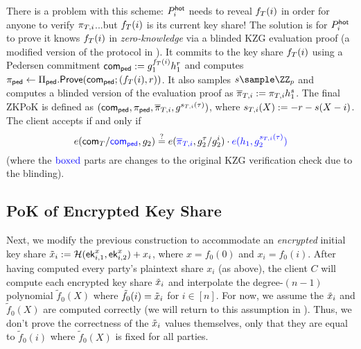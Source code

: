 There is a problem with this scheme: $P_i^{\mathsf{hot}}$ needs to reveal $f_{T}(i)$ in order for anyone to verify $\pi_{T,i}$...but $f_{T}(i)$ is its current key share! The solution is for $P_i^{\mathsf{hot}}$ to prove it knows $f_{T}(i)$ in \emph{zero-knowledge} via a blinded KZG evaluation proof (a modified version of the protocol in \cite[\S6.1]{CCS:ZBKMNS22}).
It commits to the key share $f_{T}(i)$ using a Pedersen commitment $\mathsf{com}_{\sf ped} := g_1^{f_{T}(i)} h_1^r$
and computes $\pi_{\sf ped} \gets \Pi_{\sf ped}.\mathsf{Prove}(\mathsf{com}_{\sf ped}; (f_{T}(i), r))$. 
It also samples $s \sample \ZZ_p$ and computes a blinded version of the evaluation proof as $\overline{\pi}_{T,i} := \pi_{T,i} h_1^s$.
The final ZKPoK is defined as $(\mathsf{com}_{\sf ped}, \pi_{\sf ped}, \overline{\pi}_{T,i}, g^{s_{T,i}(\tau)})$, where $s_{T,i}(X) := -r - s(X-i)$. The client accepts if and only if 
\[
    e(\mathsf{com}_{T}/\textcolor{blue}{\mathsf{com}_{\sf ped}}, g_2)
    \stackrel{?}{=}
    e(\textcolor{blue}{\overline{\pi}_{T,i}}, g_2^\tau/g_2^i) \cdot \textcolor{blue}{e(h_1, g_2^{s_{T,i}(\tau)})} 
\]
(where the $\textcolor{blue}{\text{boxed}}$ parts are changes to the original KZG verification check due to the blinding).

\subsection{PoK of Encrypted Key Share}\label{subsec:enc_pok}

Next, we modify the previous construction to accommodate an \emph{encrypted} initial key share $\tilde{x}_i := \mathcal{H}(\mathsf{ek}_{i,1}^x, \mathsf{ek}_{i,2}^x) + x_i$, where $x = f_0(0)$ and $x_i = f_0(i)$. After having computed every party's plaintext share $x_i$ (as above), the client $C$ will compute each encrypted key share $\tilde{x}_i$ and interpolate the degree-$(n-1)$ polynomial $\tilde{f}_0(X)$ where $\tilde{f}_0(i) = \tilde{x}_i$ for $i \in [n]$. 
For now, we assume the $\tilde{x}_i$ and $\tilde{f}_0(X)$ are computed correctly (we will return to this assumption in ). Thus, we don't prove the correctness of the $\tilde{x}_i$ values themselves, only that they are equal to $\tilde{f}_0(i)$ where $\tilde{f}_0(X)$ is fixed for all parties.

